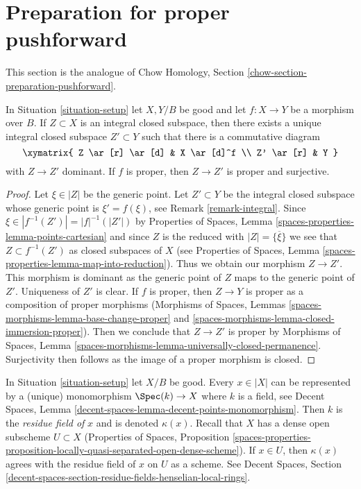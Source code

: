 \section{Preparation for proper pushforward}
\label{section-preparation-pushforward}

\noindent
This section is the analogue of
Chow Homology, Section \ref{chow-section-preparation-pushforward}.

\begin{lemma}
\label{lemma-proper-image}
In Situation \ref{situation-setup} let $X,Y/B$ be good and let $f : X \to Y$
be a morphism over $B$. If $Z \subset X$ is an integral closed subspace, then
there exists a unique integral closed subspace $Z' \subset Y$ such that there
is a commutative diagram
$$
\xymatrix{
Z \ar[r] \ar[d] & X \ar[d]^f \\
Z' \ar[r] & Y
}
$$
with $Z \to Z'$ dominant. If $f$ is proper, then $Z \to Z'$ is proper
and surjective.
\end{lemma}

\begin{proof}
Let $\xi \in |Z|$ be the generic point. Let $Z' \subset Y$ be the integral
closed subspace whose generic point is $\xi' = f(\xi)$, see
Remark \ref{remark-integral}. Since $\xi \in |f^{-1}(Z')| = |f|^{-1}(|Z'|)$
by Properties of Spaces, Lemma \ref{spaces-properties-lemma-points-cartesian}
and since $Z$ is the reduced with $|Z| = \overline{\{\xi\}}$
we see that $Z \subset f^{-1}(Z')$ as closed subspaces of $X$ (see
Properties of Spaces, Lemma \ref{spaces-properties-lemma-map-into-reduction}).
Thus we obtain our morphism $Z \to Z'$.
This morphism is dominant as the generic point of $Z$
maps to the generic point of $Z'$. Uniqueness of $Z'$ is clear.
If $f$ is proper, then $Z \to Y$ is proper as a composition
of proper morphisms (Morphisms of Spaces, Lemmas
\ref{spaces-morphisms-lemma-base-change-proper} and
\ref{spaces-morphisms-lemma-closed-immersion-proper}).
Then we conclude that $Z \to Z'$ is proper by
Morphisms of Spaces, Lemma
\ref{spaces-morphisms-lemma-universally-closed-permanence}.
Surjectivity then follows as the image of a proper morphism is closed.
\end{proof}

\begin{remark}
\label{remark-residue-field}
In Situation \ref{situation-setup} let $X/B$ be good. Every $x \in |X|$
can be represented by a (unique) monomorphism $\Spec(k) \to X$ where
$k$ is a field, see
Decent Spaces, Lemma \ref{decent-spaces-lemma-decent-points-monomorphism}.
Then $k$ is the {\it residue field of} $x$ and is denoted $\kappa(x)$.
Recall that $X$ has a dense open subscheme $U \subset X$
(Properties of Spaces, Proposition
\ref{spaces-properties-proposition-locally-quasi-separated-open-dense-scheme}).
If $x \in U$, then $\kappa(x)$ agrees with the residue
field of $x$ on $U$ as a scheme. See Decent Spaces, Section
\ref{decent-spaces-section-residue-fields-henselian-local-rings}.
\end{remark}

